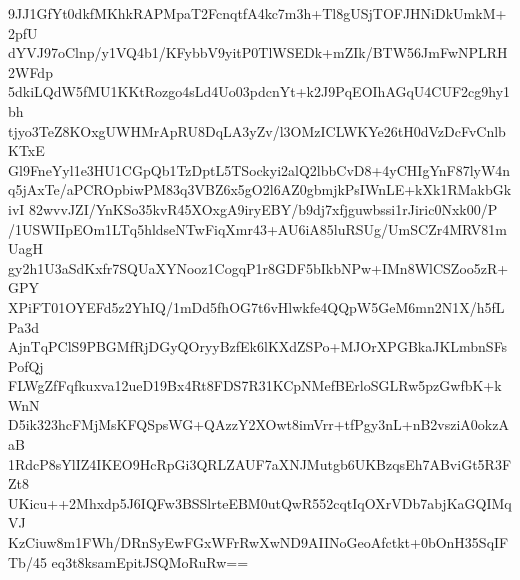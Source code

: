 9JJ1GfYt0dkfMKhkRAPMpaT2FcnqtfA4kc7m3h+Tl8gUSjTOFJHNiDkUmkM+2pfU
dYVJ97oClnp/y1VQ4b1/KFybbV9yitP0TlWSEDk+mZIk/BTW56JmFwNPLRH2WFdp
5dkiLQdW5fMU1KKtRozgo4sLd4Uo03pdcnYt+k2J9PqEOIhAGqU4CUF2cg9hy1bh
tjyo3TeZ8KOxgUWHMrApRU8DqLA3yZv/l3OMzICLWKYe26tH0dVzDcFvCnlbKTxE
Gl9FneYyl1e3HU1CGpQb1TzDptL5TSockyi2alQ2lbbCvD8+4yCHIgYnF87lyW4n
q5jAxTe/aPCROpbiwPM83q3VBZ6x5gO2l6AZ0gbmjkPsIWnLE+kXk1RMakbGkivI
82wvvJZI/YnKSo35kvR45XOxgA9iryEBY/b9dj7xfjguwbssi1rJiric0Nxk00/P
/1USWIIpEOm1LTq5hldseNTwFiqXmr43+AU6iA85luRSUg/UmSCZr4MRV81mUagH
gy2h1U3aSdKxfr7SQUaXYNooz1CogqP1r8GDF5bIkbNPw+IMn8WlCSZoo5zR+GPY
XPiFT01OYEFd5z2YhIQ/1mDd5fhOG7t6vHlwkfe4QQpW5GeM6mn2N1X/h5fLPa3d
AjnTqPClS9PBGMfRjDGyQOryyBzfEk6lKXdZSPo+MJOrXPGBkaJKLmbnSFsPofQj
FLWgZfFqfkuxva12ueD19Bx4Rt8FDS7R31KCpNMefBErloSGLRw5pzGwfbK+kWnN
D5ik323hcFMjMsKFQSpsWG+QAzzY2XOwt8imVrr+tfPgy3nL+nB2vsziA0okzAaB
1RdcP8sYlIZ4IKEO9HcRpGi3QRLZAUF7aXNJMutgb6UKBzqsEh7ABviGt5R3FZt8
UKicu++2Mhxdp5J6IQFw3BSSlrteEBM0utQwR552cqtIqOXrVDb7abjKaGQIMqVJ
KzCiuw8m1FWh/DRnSyEwFGxWFrRwXwND9AIINoGeoAfctkt+0bOnH35SqIFTb/45
eq3t8ksamEpitJSQMoRuRw==
